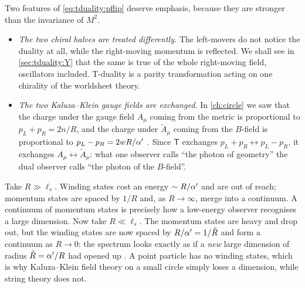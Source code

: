 Two features of \eqref{eq:tduality:pflip} deserve emphasis, because they are stronger than
the invariance of $M^2$.
\begin{itemize}[leftmargin=*]
\item \emph{The two chiral halves are treated differently.} The left-movers do not notice the
 duality at all, while the right-moving momentum is reflected. We shall see in
 \cref{sec:tduality:Y} that the same is true of the whole right-moving field, oscillators
 included. T-duality is a parity transformation acting on one chirality of the worldsheet
 theory.
\item \emph{The two Kaluza--Klein gauge fields are exchanged.} In \cref{ch:circle} we saw
 that the charge under the gauge field $A_\mu$ coming from the metric is proportional to
 $p_L+p_R=2n/R$, and the charge under $\tilde A_\mu$ coming from the $B$-field is proportional to
 $p_L-p_R=2wR/\alpha'$ . Since $\mathsf T$ exchanges
 $p_L+p_R\leftrightarrow p_L-p_R$, it exchanges $A_\mu\leftrightarrow\tilde A_\mu$: what one
 observer calls ``the photon of geometry'' the dual observer calls ``the photon of the
 $B$-field''.
\end{itemize}

\begin{physicsbox}
Take $R\gg\ell_s$. Winding states cost an energy $\sim R/\alpha'$ and are out of reach; momentum
states are spaced by $1/R$ and, as $R\to\infty$, merge into a continuum. A continuum of
momentum states is precisely how a low-energy observer recognises a large dimension. Now take
$R\ll\ell_s$. The momentum states are heavy and drop out, but the winding states are now spaced
by $R/\alpha'=1/\tilde R$ and form a continuum as $R\to0$: the spectrum looks exactly as if a
\emph{new} large dimension of radius $\tilde R=\alpha'/R$ had opened up
. A point particle has no winding states, which is why
Kaluza--Klein field theory on a small circle simply loses a dimension, while string theory
does not.
\end{physicsbox}

